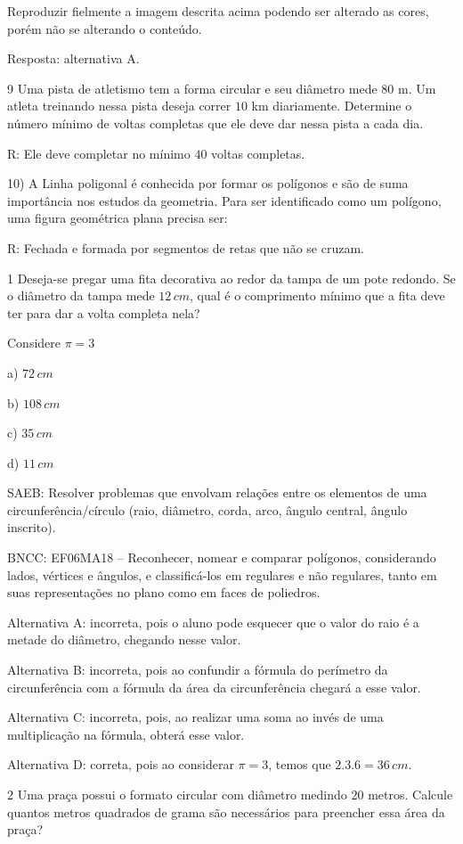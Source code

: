 Reproduzir fielmente a imagem descrita acima podendo ser alterado as
cores, porém não se alterando o conteúdo.

Resposta: alternativa A.

\num{9}  Uma pista de atletismo tem a forma circular e seu diâmetro mede $80$ m.
Um atleta treinando nessa pista deseja correr $10$ km diariamente.
Determine o número mínimo de voltas completas que ele deve dar nessa
pista a cada dia.

R: Ele deve completar no mínimo $40$ voltas completas.

10) A Linha poligonal é conhecida por formar os polígonos e são de suma
importância nos estudos da geometria. Para ser identificado como um
polígono, uma figura geométrica plana precisa ser:

R: Fechada e formada por segmentos de retas que não se cruzam.


\num{1}  Deseja-se pregar uma fita decorativa ao redor da tampa de um pote
redondo. Se o diâmetro da tampa mede $12\,cm$, qual é o comprimento mínimo
que a fita deve ter para dar a volta completa nela?

Considere $π = 3$

a) $72\,cm$

b) $108\,cm$

c) $35\,cm$

d) $11\,cm$

SAEB: Resolver problemas que envolvam relações entre os elementos de uma
circunferência/círculo (raio, diâmetro, corda, arco, ângulo central,
ângulo inscrito).

BNCC: EF06MA18 -- Reconhecer, nomear e comparar polígonos, considerando
lados, vértices e ângulos, e classificá-los em regulares e não
regulares, tanto em suas representações no plano como em faces de
poliedros.

Alternativa A: incorreta, pois o aluno pode esquecer que o valor do raio
é a metade do diâmetro, chegando nesse valor.

Alternativa B: incorreta, pois ao confundir a fórmula do perímetro da
circunferência com a fórmula da área da circunferência chegará a esse
valor.

Alternativa C: incorreta, pois, ao realizar uma soma ao invés de uma
multiplicação na fórmula, obterá esse valor.

Alternativa D: correta, pois ao considerar $\pi = 3$, temos que $2.3.6 = 36\,cm$.

\num{2}  Uma praça possui o formato circular com diâmetro medindo $20$ metros.
Calcule quantos metros quadrados de grama são necessários para preencher
essa área da praça?

